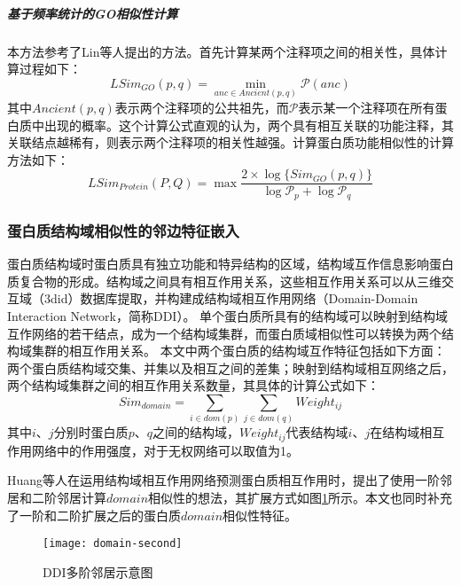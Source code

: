 \subparagraph*{基于频率统计的GO相似性计算}

本方法参考了Lin等人\cite{lin_information-theoretic_1998}提出的方法。首先计算某两个注释项之间的相关性，具体计算过程如下：
\begin{equation}
    \label{equ:feat:go:SimItemLin}
    LSim_{GO}(p,q)=\min_{anc \in Ancient(p,q)}\mathcal{P} (anc)
\end{equation}
其中$Ancient(p,q)$表示两个注释项的公共祖先，而$\mathcal{P}$表示某一个注释项在所有蛋白质中出现的概率。这个计算公式直观的认为，两个具有相互关联的功能注释，其关联结点越稀有，则表示两个注释项的相关性越强。计算蛋白质功能相似性的计算方法如下：
\begin{equation}
    \label{equ:feat:go:SimProteinLin}
    LSim_{Protein}(P,Q)=\max{\frac{2\times \log \{Sim_{GO}(p,q)\}}{\log {\mathcal{P}_p}+\log {\mathcal{P}_q}} }
\end{equation}

\subsubsection{蛋白质结构域相似性的邻边特征嵌入}

蛋白质结构域时蛋白质具有独立功能和特异结构的区域，结构域互作信息影响蛋白质复合物的形成\cite{kim_relating_2006}。结构域之间具有相互作用关系，这些相互作用关系可以从三维交互域（3did）数据库\cite{mosca_3did_2014}提取，并构建成结构域相互作用网络（Domain-Domain Interaction Network，简称DDI）。
单个蛋白质所具有的结构域可以映射到结构域互作网络的若干结点，成为一个结构域集群，而蛋白质域相似性可以转换为两个结构域集群的相互作用关系。
本文中两个蛋白质的结构域互作特征包括如下方面：两个蛋白质结构域交集、并集以及相互之间的差集；映射到结构域相互网络之后，两个结构域集群之间的相互作用关系数量，其具体的计算公式如下：
\begin{equation}
    \label{equ:feat:domain}
    Sim_{domain} = \sum_{i \in dom(p)}{\sum_{j \in dom(q)}{Weight_{ij}}}
\end{equation}
其中$i$、$j$分别时蛋白质$p$、$q$之间的结构域，$Weight_{ij}$代表结构域$i$、$j$在结构域相互作用网络中的作用强度，对于无权网络可以取值为1。

Huang等人\cite{huang_protein-protein_2013}在运用结构域相互作用网络预测蛋白质相互作用时，提出了使用一阶邻居和二阶邻居计算$domain$相似性的想法，其扩展方式如图\ref{fig:domain-second}所示。本文也同时补充了一阶和二阶扩展之后的蛋白质$domain$相似性特征。
\begin{figure}[htbp]
    \centering
    \texttt{[image: domain-second]}
    \caption{DDI多阶邻居示意图\cite{huang_protein-protein_2013}}
    \label{fig:domain-second}
\end{figure}

